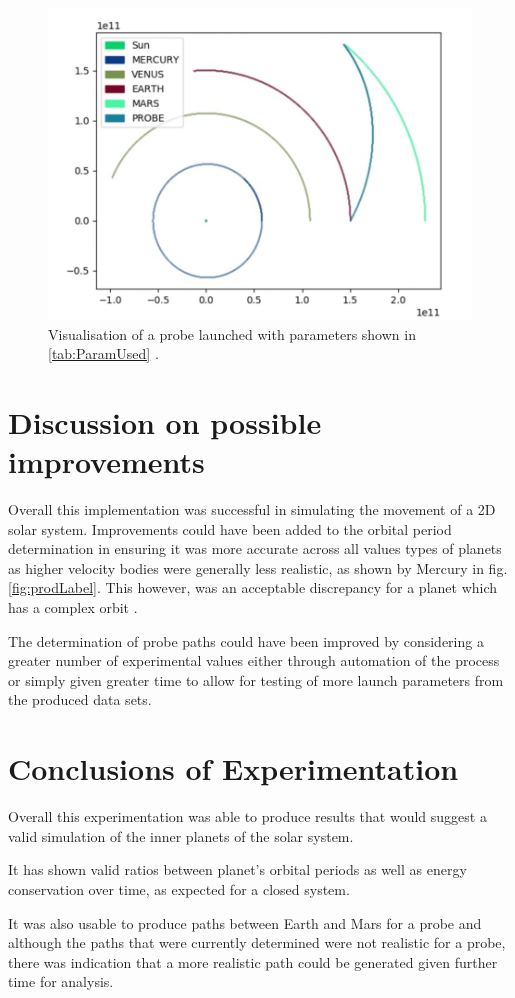 \documentclass{article}
\begin{document}
                
                \begin{figure}[!ht]
                    \centering
                    \includegraphics[width=0.5\linewidth]{Figures/ProbePathVisulisation.png}
                    \caption{Visualisation of a probe launched with parameters shown in \ref{tab:ParamUsed} .} 
                    \label{fig:ProbeVisualisation}
                \end{figure}

    \pagebreak       
    \section{Discussion on possible improvements}
        Overall this implementation was successful in simulating the movement of a 2D solar 
        system. Improvements could have been  added to the orbital period determination in ensuring 
        it was more accurate across all values types of planets as higher velocity bodies were 
        generally less realistic, as shown by Mercury in fig.\ref{fig:prodLabel}. This however, was an
        acceptable discrepancy for a planet which has a complex orbit \cite{MercuryOrbit}.

        The determination of probe paths could have been improved by considering a greater number 
        of experimental values either through automation of the process or simply given greater
        time to allow for testing of more launch parameters from the produced data sets. 


    \section{Conclusions of Experimentation}
    Overall this experimentation was able to produce results that would suggest a valid simulation of 
    the inner planets of the solar system. 
    \par
    It has shown valid ratios between planet's orbital periods as well as energy conservation 
    over time, as expected for a closed system.
    \par
    It was also usable to produce paths between Earth and Mars for a probe and although the paths 
    that were currently determined were not realistic for a probe, there was indication that a more 
    realistic path could be generated given further time for analysis.  
    
\end{document}
